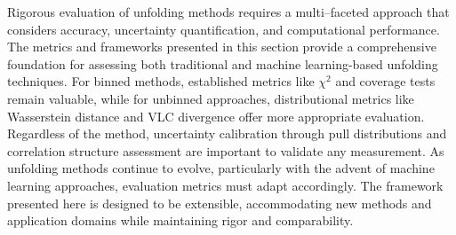 Rigorous evaluation of unfolding methods requires a multi--faceted approach that considers accuracy, uncertainty quantification, and computational performance.
%
The metrics and frameworks presented in this section provide a comprehensive foundation for assessing both traditional and machine learning-based unfolding techniques.
%
For binned methods, established metrics like \(\chi^2\) and coverage tests remain valuable, while for unbinned approaches, distributional metrics like Wasserstein distance and VLC divergence offer more appropriate evaluation.
%
Regardless of the method, uncertainty calibration through pull distributions and correlation structure assessment are important to validate any measurement.
%
As unfolding methods continue to evolve, particularly with the advent of machine learning approaches, evaluation metrics must adapt accordingly.
%
The framework presented here is designed to be extensible, accommodating new methods and application domains while maintaining rigor and comparability.